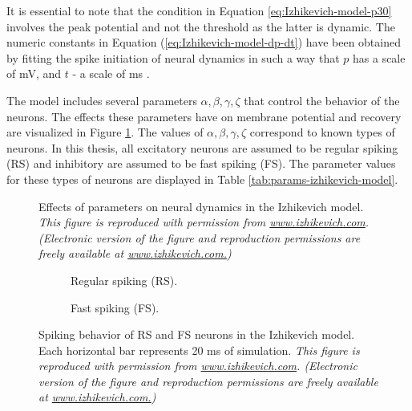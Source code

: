 It is essential to note that the condition in Equation \ref{eq:Izhikevich-model-p30} involves the peak potential and not the threshold as the latter is dynamic.
The numeric constants in Equation (\ref{eq:Izhikevich-model-dp-dt}) have been obtained by fitting the spike initiation of neural dynamics in such a way that $p$ has a scale of mV, and $t$ - a scale of ms \cite{Izhikevich2003}.


The model includes several parameters $\alpha, \beta, \gamma, \zeta$ that control the behavior of the neurons. 
The effects these parameters have on membrane potential and recovery are visualized in Figure \ref{fig:neural-dynamics}. 
The values of $\alpha, \beta, \gamma, \zeta$ correspond to known types of neurons. In this thesis, all excitatory neurons are assumed to be regular spiking (RS) and inhibitory are assumed to be fast spiking (FS). 
The parameter values for these types of neurons are displayed in Table \ref{tab:params-izhikevich-model}.

\begin{figure}[!htp]
    \centering
    
    \caption[Effects of Izhikevich parameters on neural dynamics]{Effects of parameters on neural dynamics in the Izhikevich model. {\it This figure is reproduced with permission from \url{www.izhikevich.com}. (Electronic version of the figure and reproduction permissions are freely available at \url{www.izhikevich.com.})}}
    \label{fig:neural-dynamics}
\end{figure}

\begin{figure}[!htp]
    \hspace*{-1.5cm} 
    \centering
    \begin{subfigure}[t]{0.3\textwidth}
        \centering
        
        \caption{Regular spiking (RS).}
        \label{fig:neuron-types-rs}
    \end{subfigure}
    \hspace{0.1\textwidth}
    \begin{subfigure}[t]{0.3\textwidth}
        \centering
        
        \caption{Fast spiking (FS).}
        \label{fig:neuron-types-fs}
    \end{subfigure}
    \caption[Spiking behavior of RS and FS neurons]{Spiking behavior of RS and FS neurons in the Izhikevich model. Each horizontal bar represents 20 ms of simulation. {\it This figure is reproduced with permission from \url{www.izhikevich.com}. (Electronic version of the figure and reproduction permissions are freely available at \url{www.izhikevich.com.})}}
    \label{fig:neuron-types}
\end{figure}

